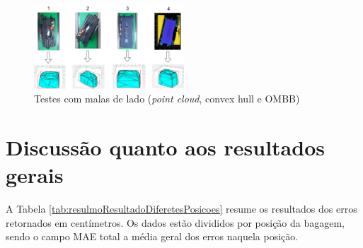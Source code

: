         \begin{figure}[h]
           \centering
           \includegraphics[width=0.5\textwidth]{imagens/imagens_tabelas/resultadosMalasDeLado/testes_Malas_de_lado.png} 
           \caption{Testes com malas de lado (\textit{point cloud}, convex hull e OMBB)}
           \label{fig:Malas_DeLado}
        \end{figure}


\begin{table}[h!]
\centering
{}
\caption{Resultado da exatidão do protótipo, malas de lado}
\label{tab:Resultado da precisão do protótipo, malas de lado}
\end{table}





\section{Discussão quanto aos resultados gerais}
\label{sec_Discussão quanto aos resultados gerais}

A Tabela \ref{tab:resulmoResultadoDiferetesPosicoes} resume os resultados dos erros retornados em centímetros. Os dados estão divididos por posição da bagagem, sendo o campo MAE total a média geral dos erros naquela posição.


